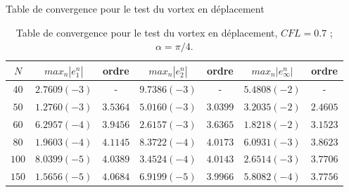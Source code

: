\documentclass[11pt]{beamer}
\begin{document}
\begin{frame}{Table de convergence pour le test du vortex en déplacement}
\begin{table}
\begin{tabular}{c||cc|cc|cc}
$N$ & $max_n |e_1^n|$ & ordre  & $max_n |e_2^n|$ & ordre  & $max_n |e_{\infty}^n|$ & ordre \\
\hline
\hline
$40$ & $2.7609 (-3)$ & -  & $9.7386 (-3)$ & - & $5.4808 (-2)$  & - \\
\hline 
$50$ & $1.2760 (-3)$ & $3.5364$ & $5.0160 (-3)$ & $3.0399$ & $3.2035 (-2)$ & $2.4605$ \\
\hline
$60$ & $6.2957 (-4)$ & $3.9456$ & $2.6157 (-3)$ & $3.6365$ & $1.8218 (-2)$ & $3.1523$ \\
\hline
$80$ & $1.9603 (-4) $ & $4.1145$ & $8.3722 (-4)$ & $4.0173$ & $6.0931 (-3)$ & $3.8623$ \\
\hline
$100$ & $8.0399 (-5)$ & $4.0389$ & $3.4524 (-4)$ & $4.0143$ & $2.6514 (-3)$ & $3.7706$\\
\hline
$150$ & $1.5656 (-5)$ & $4.0684$ & $6.9199 (-5)$ & $3.9966$ & $5.8082 (-4)$ & $3.7756$
\end{tabular}
\caption{Table de convergence pour le test du vortex en déplacement, $CFL = 0.7$ ; $\alpha = \pi /4$.}\end{table}

\end{frame}



\end{document}
